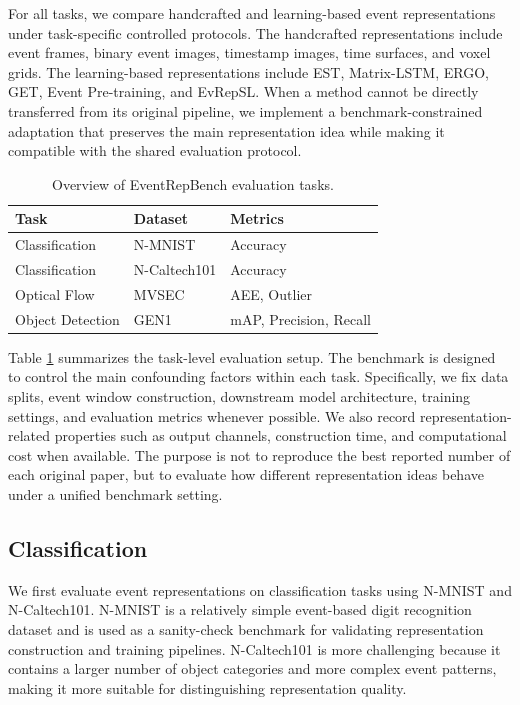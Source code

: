 \documentclass[letterpaper]{article}
\begin{document}
For all tasks, we compare handcrafted and learning-based event representations under task-specific controlled protocols. The handcrafted representations include event frames, binary event images, timestamp images, time surfaces, and voxel grids. The learning-based representations include EST, Matrix-LSTM, ERGO, GET, Event Pre-training, and EvRepSL. When a method cannot be directly transferred from its original pipeline, we implement a benchmark-constrained adaptation that preserves the main representation idea while making it compatible with the shared evaluation protocol.

\begin{table}[htbp]
\centering
\begin{tabular}{l|l|l}
Task & Dataset & Metrics \\
\hline
Classification & N-MNIST & Accuracy \\
Classification & N-Caltech101 & Accuracy \\
Optical Flow & MVSEC & AEE, Outlier \\
Object Detection & GEN1 & mAP, Precision, Recall \\
\end{tabular}
\caption{Overview of EventRepBench evaluation tasks.}
\label{tab:tasks}
\end{table}

Table \ref{tab:tasks} summarizes the task-level evaluation setup. The benchmark is designed to control the main confounding factors within each task. Specifically, we fix data splits, event window construction, downstream model architecture, training settings, and evaluation metrics whenever possible. We also record representation-related properties such as output channels, construction time, and computational cost when available. The purpose is not to reproduce the best reported number of each original paper, but to evaluate how different representation ideas behave under a unified benchmark setting.

\subsection{Classification}
We first evaluate event representations on classification tasks using N-MNIST and N-Caltech101. N-MNIST is a relatively simple event-based digit recognition dataset and is used as a sanity-check benchmark for validating representation construction and training pipelines. N-Caltech101 is more challenging because it contains a larger number of object categories and more complex event patterns, making it more suitable for distinguishing representation quality.
\end{document}
